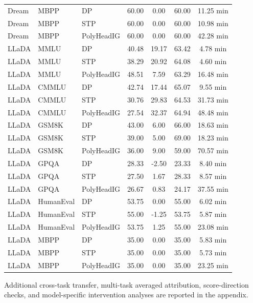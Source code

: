 \begin{table}[t]
\begin{tabular}{lllcccc}
Dream & MBPP & DP & 60.00 & 0.00 & 60.00 & 11.25 min \\
Dream & MBPP & STP & 60.00 & 0.00 & 60.00 & 10.98 min \\
Dream & MBPP & PolyHeadIG & 60.00 & 0.00 & 60.00 & 42.28 min \\
LLaDA & MMLU & DP & 40.48 & 19.17 & 63.42 & 4.78 min \\
LLaDA & MMLU & STP & 38.29 & 20.92 & 64.08 & 4.60 min \\
LLaDA & MMLU & PolyHeadIG & 48.51 & 7.59 & 63.29 & 16.48 min \\
LLaDA & CMMLU & DP & 42.74 & 17.44 & 65.07 & 9.55 min \\
LLaDA & CMMLU & STP & 30.76 & 29.83 & 64.53 & 31.73 min \\
LLaDA & CMMLU & PolyHeadIG & 27.54 & 32.37 & 64.94 & 48.48 min \\
LLaDA & GSM8K & DP & 43.00 & 6.00 & 66.00 & 18.63 min \\
LLaDA & GSM8K & STP & 39.00 & 5.00 & 69.00 & 18.23 min \\
LLaDA & GSM8K & PolyHeadIG & 36.00 & 9.00 & 59.00 & 70.57 min \\
LLaDA & GPQA & DP & 28.33 & -2.50 & 23.33 & 8.40 min \\
LLaDA & GPQA & STP & 27.50 & 1.67 & 28.33 & 8.57 min \\
LLaDA & GPQA & PolyHeadIG & 26.67 & 0.83 & 24.17 & 37.55 min \\
LLaDA & HumanEval & DP & 53.75 & 0.00 & 55.00 & 6.02 min \\
LLaDA & HumanEval & STP & 55.00 & -1.25 & 53.75 & 5.87 min \\
LLaDA & HumanEval & PolyHeadIG & 53.75 & 1.25 & 55.00 & 23.08 min \\
LLaDA & MBPP & DP & 35.00 & 0.00 & 35.00 & 5.83 min \\
LLaDA & MBPP & STP & 35.00 & 0.00 & 35.00 & 5.73 min \\
LLaDA & MBPP & PolyHeadIG & 35.00 & 0.00 & 35.00 & 23.25 min \\
\hline
\end{tabular}
\end{table}

Additional cross-task transfer, multi-task averaged attribution, score-direction checks, and model-specific intervention analyses are reported in the appendix.
